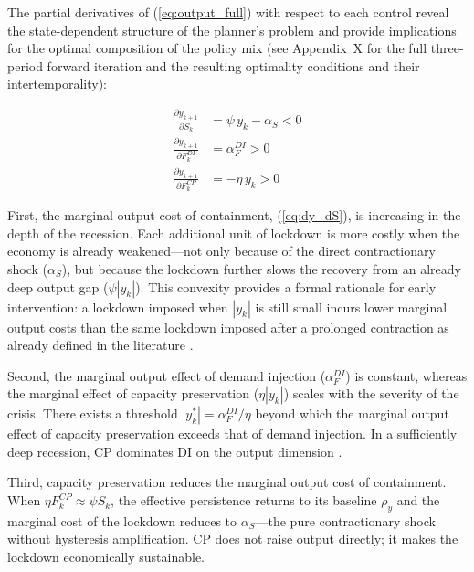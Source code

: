 The partial derivatives of (\ref{eq:output_full}) with respect to each control reveal the state-dependent structure of the planner's problem and provide implications for the optimal composition of the policy mix (see Appendix~X for the full three-period forward iteration and the resulting optimality conditions and their intertemporality):

%
\begin{align}
    \frac{\partial y_{k+1}}{\partial S_k}       &= \psi \, y_k - \alpha_S < 0
    \label{eq:dy_dS} \\[6pt]
    \frac{\partial y_{k+1}}{\partial F_k^{DI}}  &= \alpha_F^{DI} > 0
    \label{eq:dy_dDI} \\[6pt]
    \frac{\partial y_{k+1}}{\partial F_k^{CP}}  &= -\eta \, y_k > 0
    \label{eq:dy_dCP}
\end{align}
%

\noindent First, the marginal output cost of containment, (\ref{eq:dy_dS}), is increasing in the depth of the recession. Each additional unit of lockdown is more costly when the economy is already weakened---not only because of the direct contractionary shock ($\alpha_S$), but because the lockdown further slows the recovery from an already deep output gap ($\psi |y_k|$). This convexity provides a formal rationale for early intervention: a lockdown imposed when $|y_k|$ is still small incurs lower marginal output costs than the same lockdown imposed after a prolonged contraction as already defined in the literature \citep{acemoglu2021}.

Second, the marginal output effect of demand injection ($\alpha_F^{DI}$) is constant, whereas the marginal effect of capacity preservation ($\eta |y_k|$) scales with the severity of the crisis. There exists a threshold $|y_k^*| = \alpha_F^{DI} / \eta$ beyond which the marginal output effect of capacity preservation exceeds that of demand injection. In a sufficiently deep recession, CP dominates DI on the output dimension \citep{deb2021}.

Third, capacity preservation reduces the marginal output cost of containment. When $\eta F_k^{CP} \approx \psi S_k$, the effective persistence returns to its baseline $\rho_y$ and the marginal cost of the lockdown reduces to $\alpha_S$---the pure contractionary shock without hysteresis amplification. CP does not raise output directly; it makes the lockdown economically sustainable.

